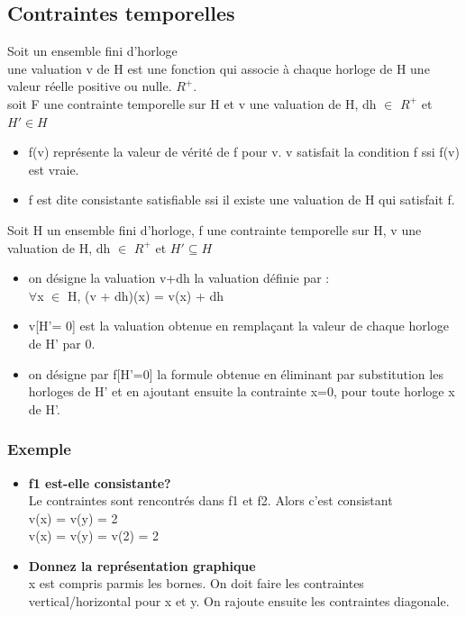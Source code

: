 \documentclass[oneside]{book}
\begin{document}
    
    \subsection{Contraintes temporelles}
    Soit un ensemble fini d'horloge\\
    
    une valuation v de H est une fonction qui associe à chaque horloge de H une valeur réelle positive ou nulle. $R^{+}$.\\
    
    soit F une contrainte temporelle sur H et v une valuation de H, dh $\in$ $R^+$ et $H' \in H $\\
    
    \begin{itemize}
    	\item f(v) représente la valeur de vérité de f pour v. v satisfait la condition f ssi f(v) est vraie.
    	\item f est dite consistante satisfiable ssi il existe une valuation de H qui satisfait f.
    \end{itemize}
       
    Soit H un ensemble fini d'horloge, f une contrainte temporelle sur H, v une valuation de H, dh $\in$ $R^+$ et $H' \subseteq H$
    \begin{itemize}
    	\item on désigne la valuation v+dh la valuation définie par : \\
    	$\forall$x $\in$ H, (v + dh)(x) = v(x) + dh
    	\item v[H'= 0] est la valuation obtenue en remplaçant la valeur de chaque horloge de H' par 0.
    	\item on désigne par f[H'=0] la formule obtenue en éliminant par substitution les horloges de H' et en ajoutant ensuite la contrainte x=0, pour toute horloge x de H'.
    \end{itemize}
    
    \subsubsection{Exemple}
    
    \begin{itemize}
        \item 
        \textbf{f1 est-elle consistante?} \\
        Le contraintes sont rencontrés dans f1 et f2. Alors c'est consistant\\
         v(x) = v(y) = 2\\
         v(x) = v(y) = v(2) = 2
         
        \item 
        \textbf{Donnez la représentation graphique}\\
         x est compris parmis les bornes. On doit faire les contraintes vertical/horizontal pour x et y. On rajoute ensuite les contraintes diagonale.\\
         
        
        
        
    \end{itemize}
    
\end{document}
